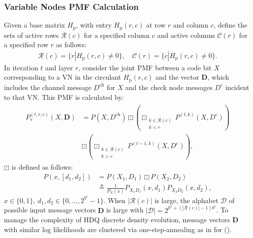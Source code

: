 \documentclass [PhD] {uclathes}
\begin{document}
\subsubsection{Variable Nodes PMF Calculation}
Given a base matrix $H_\text{p}$, with entry $H_\text{p}(r,c)$ at row $r$ and column $c$, define the sets of active rows $\mathcal{R}(c)$ for a specified column $c$ and active columns $ \mathcal{C}(r)$ for a specified row $r$ as follows:
\begin{align}
\mathcal{R}(c) = \{r| H_\text{p}(r,c)\neq0\}
,\quad 
\mathcal{C}(r)= \{c| H_\text{p}(r,c)\neq0\}.
\end{align}
In iteration $t$ and layer $r$, consider the joint PMF between a code bit $X$ corresponding to a VN in the circulant $H_\text{p}(r,c)$ and the vector $\mathbf{D}$, which includes the channel message $D^{\text{ch}}$ for $X$ and the check node messages $D^{\text{c}}$ incident to that VN.  This PMF is calculated by:
\begin{align}
\begin{split}
        P_\text{v}^{(t,r,c)}(X,\mathbf{D})&=P(X,D^{\text{ch}})\boxdot\left(\boxdot_{\substack{k\in\mathcal{R}(c) \\ k<r}}P^{(t,k)}(X,D^{\text{c}})\right) \\&\boxdot\left(\boxdot_{\substack{k\in\mathcal{R}(c) \\ k>r}}P^{(t-1,k)}(X,D^{\text{c}})\right), 
\end{split}
    \label{eq: vari_update}
\end{align}
$\boxdot$ is defined as follows: 
\begin{align}
    P(x,[d_1,d_2])&=P({X_1,D_1})\boxdot P({X_2,D_2})\\&\triangleq\frac{1}{P_X(x)}P_{X_1D_1}(x,d_1)P_{X_2D_2}(x,d_2),
\end{align}
$ x\in\{0,1\},~d_1,d_2\in\{0,\ldots,2^{b^\mathrm{e}}-1\}$. When $|\mathcal{R}(c)|$ is large, the alphabet ${\mathcal D}$ of possible input message vectors $\mathbf{D}$ is large with $|{\mathcal D}|=2^{b^\mathrm{v}+(|\mathcal{R}(c)|-1)b^\mathrm{e}}$.  To manage the complexity of HDQ discrete density evolution, message vectors $\mathbf{D}$ with similar log likelihoods are clustered via  one-step-annealing as in \cite{Wang2020-RCQ} for ().
\end{document}
